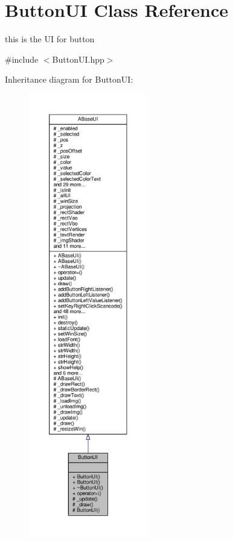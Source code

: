 \hypertarget{class_button_u_i}{}\section{Button\+UI Class Reference}
\label{class_button_u_i}


this is the UI for button  




{\ttfamily \#include $<$Button\+U\+I.\+hpp$>$}



Inheritance diagram for Button\+UI\+:
\nopagebreak
\begin{figure}[H]
\begin{center}
\leavevmode
\includegraphics[height=550pt]{class_button_u_i__inherit__graph}
\end{center}
\end{figure}


